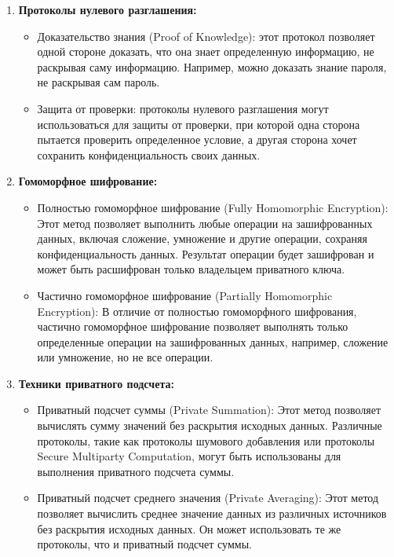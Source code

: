 \begin{enumerate}
    \item \textbf{Протоколы нулевого разглашения:} \begin{itemize}
        \item Доказательство знания (Proof of Knowledge): этот протокол позволяет одной стороне доказать, что она знает определенную информацию, не раскрывая саму информацию. Например, можно доказать знание пароля, не раскрывая сам пароль.
        \item Защита от проверки: протоколы нулевого разглашения могут использоваться для защиты от проверки, при которой одна сторона пытается проверить определенное условие, а другая сторона хочет сохранить конфиденциальность своих данных.
    \end{itemize}

    \item \textbf{Гомоморфное шифрование:} \begin{itemize}
        \item Полностью гомоморфное шифрование (Fully Homomorphic Encryption): Этот метод позволяет выполнить любые операции на зашифрованных данных, включая сложение, умножение и другие операции, сохраняя конфиденциальность данных. Результат операции будет зашифрован и может быть расшифрован только владельцем приватного ключа.
        \item Частично гомоморфное шифрование (Partially Homomorphic Encryption): В отличие от полностью гомоморфного шифрования, частично гомоморфное шифрование позволяет выполнять только определенные операции на зашифрованных данных, например, сложение или умножение, но не все операции.
    \end{itemize}

    \item \textbf{Техники приватного подсчета:} \begin{itemize}
        \item Приватный подсчет суммы (Private Summation): Этот метод позволяет вычислять сумму значений без раскрытия исходных данных. Различные протоколы, такие как протоколы шумового добавления или протоколы Secure Multiparty Computation, могут быть использованы для выполнения приватного подсчета суммы.
        \item Приватный подсчет среднего значения (Private Averaging): Этот метод позволяет вычислить среднее значение данных из различных источников без раскрытия исходных данных. Он может использовать те же протоколы, что и приватный подсчет суммы.
    \end{itemize}
\end{enumerate}
\\

